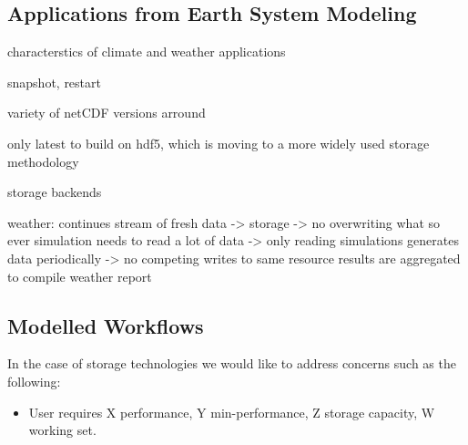 {%
\subsection{Applications from Earth System Modeling}

characterstics of climate and weather applications

snapshot, restart


variety of netCDF versions arround

only latest to build on hdf5, which is moving to a more widely used storage methodology


storage backends



weather:
continues stream of fresh data -> storage  -> no overwriting what so ever
simulation needs to read a lot of data     -> only reading
simulations generates data periodically    -> no competing writes to same resource
results are aggregated to compile weather report




%
%
%
%
%
%
%
%
%
%
%
%
%



\subsection{Modelled Workflows}






In the case of storage technologies we would like to address concerns such as the following:

\begin{itemize}
	\item User requires X performance, Y min-performance, Z storage capacity, W working set.


\end{itemize}}
